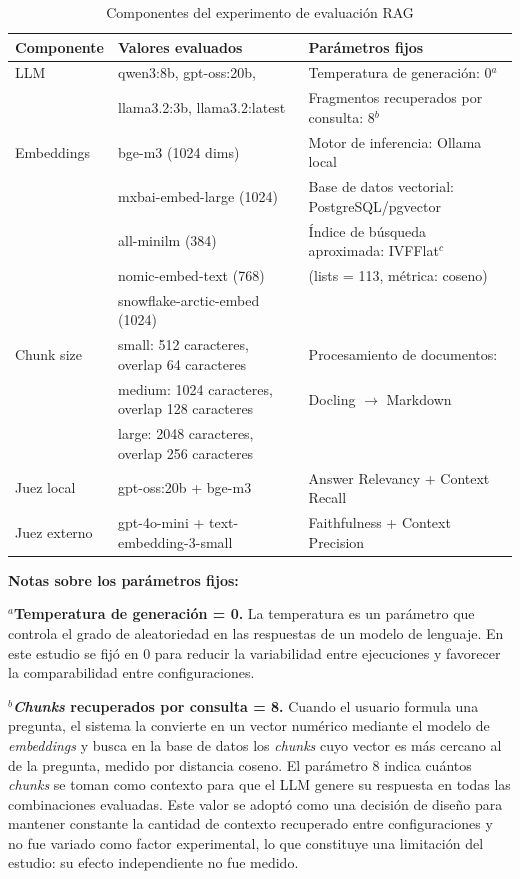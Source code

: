 \documentclass{article}
\begin{document}
\begin{table}[H]
\centering
\scriptsize
\begin{tabular}{|l|l|l|}
\hline
\textbf{Componente} & \textbf{Valores evaluados} & \textbf{Parámetros fijos} \\
\hline
LLM                & qwen3:8b, gpt-oss:20b,       & Temperatura de generación: 0$^{a}$ \\
& llama3.2:3b, llama3.2:latest & Fragmentos recuperados por consulta: 8$^{b}$ \\
\hline
Embeddings         & bge-m3 (1024 dims)           & Motor de inferencia: Ollama local \\
& mxbai-embed-large (1024)     & Base de datos vectorial: PostgreSQL/pgvector \\
& all-minilm (384)             & Índice de búsqueda aproximada: IVFFlat$^{c}$ \\
& nomic-embed-text (768)       & (lists = 113, métrica: coseno) \\
& snowflake-arctic-embed (1024) & \\
\hline
Chunk size         & small: 512 caracteres, overlap 64 caracteres  & Procesamiento de documentos: \\
& medium: 1024 caracteres, overlap 128 caracteres & Docling $\rightarrow$ Markdown \\
& large: 2048 caracteres, overlap 256 caracteres & \\
\hline
Juez local         & gpt-oss:20b + bge-m3         & Answer Relevancy + Context Recall \\
Juez externo       & gpt-4o-mini + text-embedding-3-small & Faithfulness + Context Precision \\
\hline
\end{tabular}
\caption{Componentes del experimento de evaluación RAG}
\label{tab:modelos}
\end{table}

\noindent\textbf{Notas sobre los parámetros fijos:}

\medskip
\noindent $^{a}$\textbf{Temperatura de generación = 0.} La temperatura es un parámetro que controla el grado de aleatoriedad en las respuestas de un modelo de lenguaje. En este estudio se fijó en 0 para reducir la variabilidad entre ejecuciones y favorecer la comparabilidad entre configuraciones.

\medskip
\noindent $^{b}$\textbf{\textit{Chunks} recuperados por consulta = 8.} Cuando el usuario formula una pregunta, el sistema la convierte en un vector numérico mediante el modelo de \textit{embeddings} y busca en la base de datos los \textit{chunks} cuyo vector es más cercano al de la pregunta, medido por distancia coseno. El parámetro 8 indica cuántos \textit{chunks} se toman como contexto para que el LLM genere su respuesta en todas las combinaciones evaluadas. Este valor se adoptó como una decisión de diseño para mantener constante la cantidad de contexto recuperado entre configuraciones y no fue variado como factor experimental, lo que constituye una limitación del estudio: su efecto independiente no fue medido.
\end{document}
